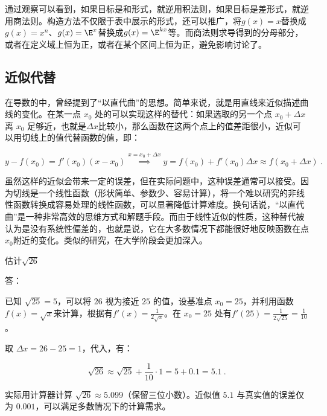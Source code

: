 通过观察可以看到，如果目标是和形式，就逆用积法则，如果目标是差形式，就逆用商法则。构造方法不仅限于表中展示的形式，还可以推广，将$g(x)=x$替换成$g(x)=x^n$、$g(x)=\E^x$替换成$g(x)=\E^{kx}$等。而商法则求导得到的分母部分，或者在定义域上恒为正，或者在某个区间上恒为正，避免影响讨论了。

\subsection{近似代替}

在导数的中，曾经提到了“以直代曲”的思想。简单来说，就是用直线来近似描述曲线的变化。在某一点 $x_0$  处的可以实现这样的替代：如果选取的另一个点  $x_0 + \Delta x$  离  $x_0$  足够近，也就是$\Delta x$比较小，那么函数在这两个点上的值差距很小，近似可以用切线上的值代替函数的值，即：

\begin{equation}\label{eq_HsDerC_1}
y-f(x_0)=f'(x_0)(x-x_0)\overset{x=x_0+\Delta x}{\implies} y=f(x_0)+f'(x_0)\Delta x\approx f(x_0+\Delta x) ~.
\end{equation}

虽然这样的近似会带来一定的误差，但在实际问题中，这种误差通常可以接受。因为切线是一个线性函数（形状简单、参数少、容易计算），将一个难以研究的非线性函数转换成容易处理的线性函数，可以显著降低计算难度。换句话说，“以直代曲”是一种非常高效的思维方式和解题手段。而由于线性近似的性质，这种替代被认为是没有系统性偏差的，也就是说，它在大多数情况下都能很好地反映函数在点$x_0$附近的变化。类似的研究，在大学阶段会更加深入。

\begin{example}{估计$\sqrt{26}$}

答：

已知 $\sqrt{25} = 5$，可以将 $26$ 视为接近 $25$ 的值，设基准点 $x_0 = 25$，并利用函数 $f(x) = \sqrt{x}$来计算，根据有$\displaystyle f'(x) = \frac{1}{2\sqrt{x}}$。在 $x_0 = 25$ 处有$\displaystyle f'(25) = \frac{1}{2\sqrt{25}} = \frac{1}{10}$。

取 $\Delta x = 26 - 25 = 1$，代入，有：

\begin{equation}
\sqrt{26} \approx \sqrt{25} + \frac{1}{10} \cdot 1 = 5 + 0.1 = 5.1~.
\end{equation}

实际用计算器计算 $\sqrt{26} \approx 5.099$（保留三位小数）。近似值 $5.1$ 与真实值的误差仅为 $0.001$，可以满足多数情况下的计算需求。
\end{example}

